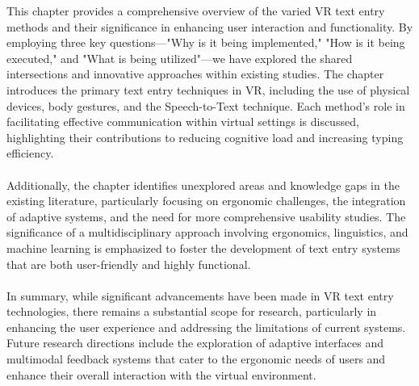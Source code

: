 This chapter provides a comprehensive overview of the varied \ac{VR} text entry methods and their significance in enhancing user interaction and functionality. By employing three key questions—"Why is it being implemented," "How is it being executed," and "What is being utilized"—we have explored the shared intersections and innovative approaches within existing studies. The chapter introduces the primary text entry techniques in \ac{VR}, including the use of physical devices, body gestures, and the Speech-to-Text technique. Each method's role in facilitating effective communication within virtual settings is discussed, highlighting their contributions to reducing cognitive load and increasing typing efficiency.\\ \\
Additionally, the chapter identifies unexplored areas and knowledge gaps in the existing literature, particularly focusing on ergonomic challenges, the integration of adaptive systems, and the need for more comprehensive usability studies. The significance of a multidisciplinary approach involving ergonomics, linguistics, and machine learning is emphasized to foster the development of text entry systems that are both user-friendly and highly functional.\\ \\
In summary, while significant advancements have been made in \ac{VR} text entry technologies, there remains a substantial scope for research, particularly in enhancing the user experience and addressing the limitations of current systems. Future research directions include the exploration of adaptive interfaces and multimodal feedback systems that cater to the ergonomic needs of users and enhance their overall interaction with the virtual environment.

